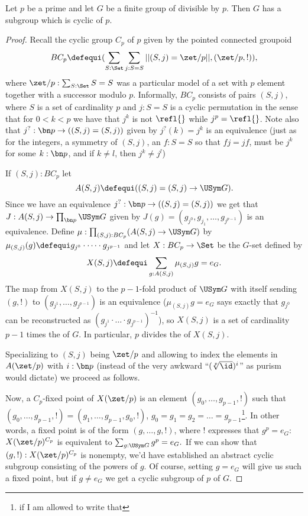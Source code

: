 \begin{theorem}
  \label{thm:cauchys}
  Let $p$ be a prime and let $G$ be a finite group of \gporder divisible by $p$.
Then $G$ has a subgroup which is cyclic of \gporder $p$.
\end{theorem}
\begin{proof}
Recall the cyclic group $C_p$ of \gporder $p$ given by the pointed connected groupoid
$$BC_p\defequi(\sum_{S:\Set}\sum_{j:S=S}||(S,j)=\zet/p||,(\zet/p,!)),
$$
 where $\zet/p:\sum_{S:\Set}S=S$ was a particular model of a set with $p$ element together with a successor modulo $p$.  Informally, $BC_p$ consists of pairs $(S,j)$, where $S$ is a set of cardinality $p$ and $j:S=S$ is a cyclic permutation in the sense that for $0<k<p$ we have that $j^k$ is not $\refl{}$ while $j^p=\refl{}$.  Note also that $j^?:\bn p\to ((S,j)=(S,j))$ given by $j^?(k)=j^k$ is an equivalence (just as for the integers, a symmetry of $(S,j)$, \ie an $f:S=S$ so that $fj=jf$, must be $j^k$ for some $k:\bn p$, and if $k\neq l$, then $j^k\neq j^l$)

If $(S,j):BC_p$ let
$$A(S,j)\defequi ((S,j)=(S,j)\to \USym G).$$  Since we have an equivalence $j^?:\bn p\to ((S,j)=(S,j))$ we get that $J:A(S,j)\to \prod_{\bn p}\USym G$ given by $J(g)=(g_{j^0},g_{j_1},\dots,g_{j^{p-1}})$ is an equivalence.  Define $\mu:\prod_{(S,j):BC_p}(A(S,j)\to\USym G)$ by $\mu_{(S,j)}(g)\defequi g_{j^0}\cdot\dots\cdot g_{j^{p-1}}$ and let $X:BC_p\to\Set$ be the $G$-set defined by
$$X(S,j)\defequi\sum_{g:A(S,j)}\mu_{(S,j)}g=e_G.$$
The map from $X(S,j)$ to the $p-1$-fold product of $\USym G$ with itself sending $(g,!)$ to $(g_{j^1},\dots,g_{j^{p-1}})$ is an equivalence ($\mu_{(S,j)}g=e_G$ says exactly that $g_{j^0}$ can be reconstructed as $(g_{j^1}\cdot\dots\cdot g_{j^{p-1}})^{-1}$), so $X(S,j)$ is a set of cardinality $p-1$ times the \gporder of $G$.  In particular, $p$ divides the \gporder of $X(S,j)$.

Specializing to $(S,j)$ being $\zet/p$ and allowing to index the elements in $A(\zet/p)$ with $i:\bn p$ (instead of the very awkward ``$(\sqrt[p]\id)^i$'' as purism would dictate) we proceed as follows.

Now, a $C_p$-fixed point of $X(\zet/p)$ is an element $(g_0,\dots,g_{p-1},!)$ such that $(g_0,\dots,g_{p-1},!)=(g_1,\dots,g_{p-1},g_0,!)$, \ie $g_0=g_1=g_2=\dots=g_{p-1}$\footnote{if I am allowed to write that}.  In other words, a fixed point is of the form $(g,\dots,g,!)$, where $!$ expresses that $g^p=e_G$:
$X(\zet/p)^{C_p}$ is equivalent to $\sum_{g:\USym G}g^p=e_G.$  If we can show that $(g,!):X(\zet/p)^{C_p}$ is nonempty, we'd have established an abstract cyclic subgroup consisting of the powers of $g$.  Of course, setting $g=e_G$ will give us such a fixed point, but if $g\neq e_G$ we get a cyclic subgroup of \gporder $p$ of $G$.


\end{proof}
